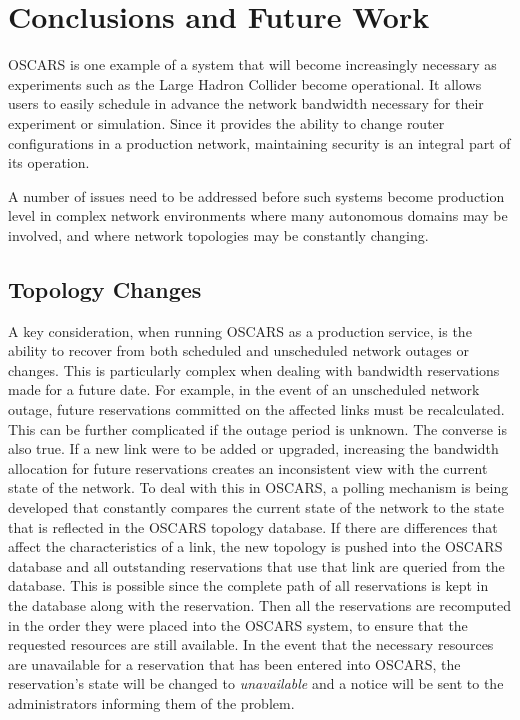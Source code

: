 \documentclass[conference]{IEEEtran}
\begin{document}
\section{Conclusions and Future Work}

OSCARS is one example of a system that will become increasingly necessary
as experiments such as the Large Hadron Collider become operational.  It
allows users to easily schedule in advance the 
network bandwidth necessary for their experiment or simulation.  Since it
provides the ability to change router configurations in a production network,
maintaining security is an integral part of its operation.

A number of issues need to be addressed before such systems become
production level in complex network environments where many autonomous
domains may be involved, and where network topologies may be constantly
changing.

\subsection{Topology Changes}

A key consideration, when running OSCARS as a production service, is the ability
to recover from both scheduled and unscheduled network outages or changes.  This
is particularly complex when dealing with bandwidth reservations made for a
future date.  For example, in the event of an unscheduled network outage, future
reservations committed on the affected links must be recalculated. This can be
further complicated if the outage period is unknown.  The converse is also true.
If a new link were to be added or upgraded, increasing the bandwidth allocation
for future reservations creates an inconsistent view with the current state of
the network.  To deal with this in OSCARS,
a polling mechanism is being developed that constantly
compares the current state of the network to the state that is reflected in the
OSCARS topology database. If there are differences that affect the
characteristics of a link, the new topology is pushed into the OSCARS database
and all outstanding reservations that use that link are queried from the
database. This is possible since the complete path of all reservations is kept
in the database along with the reservation. Then all the reservations are
recomputed in the order they were placed into the OSCARS system, to ensure that
the requested resources are still available.  In the event that the necessary
resources are unavailable for a reservation that has been entered into OSCARS,
the reservation's state will be changed to \emph{unavailable} and a notice will be
sent to the administrators informing them of the problem.
\end{document}
